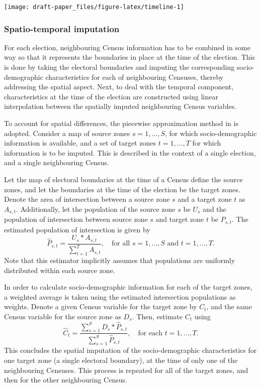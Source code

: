 \documentclass[11pt,a4paper,]{article}
\let\origfigure\figure
\let\endorigfigure\endfigure
\renewenvironment{figure}[1][2] {
    \expandafter\origfigure\expandafter[htbp]
} {
    \endorigfigure
}
\begin{document}
\begin{figure}[h]

{\centering \texttt{[image: draft-paper\_files/figure-latex/timeline-1]} 

}

\caption{Timeline of Australian elections and Censuses. They do not always occur in the same year.}\label{fig:timeline}
\end{figure}

\hypertarget{spatio-temporal-imputation}{%
\subsubsection{Spatio-temporal imputation}\label{spatio-temporal-imputation}}

For each election, neighbouring Census information has to be combined in some way so that it represents the boundaries in place at the time of the election. This is done by taking the electoral boundaries and imputing the corresponding socio-demographic characteristics for each of neighbouring Censuses, thereby addressing the spatial aspect. Next, to deal with the temporal component, characteristics at the time of the election are constructed using linear interpolation between the spatially imputed neighbouring Census variables.

To account for spatial differences, the piecewise approximation method in \textcite{Goodchild1993} is adopted. Consider a map of source zones \(s = 1,\dots,S\), for which socio-demographic information is available, and a set of target zones \(t = 1,\dots,T\) for which information is to be imputed. This is described in the context of a single election, and a single neighbouring Census.

Let the map of electoral boundaries at the time of a Census define the source zones, and let the boundaries at the time of the election be the target zones. Denote the area of intersection between a source zone \(s\) and a target zone \(t\) as \(A_{s,t}\). Additionally, let the population of the source zone \(s\) be \(U_s\) and the population of intersection between source zone \(s\) and target zone \(t\) be \(P_{s,t}\). The estimated population of intersection is given by
\[
  \hat{P}_{s,t} = \frac{U_s*A_{s,t}}{\sum_{t=1}^T A_{s,t}},
  \quad\text{for all $s=1,\dots,S$ and $t=1,\dots,T$}.
\]
Note that this estimator implicitly assumes that populations are uniformly distributed within each source zone.

In order to calculate socio-demographic information for each of the target zones, a weighted average is taken using the estimated intersection populations as weights. Denote a given Census variable for the target zone by \(C_t\), and the same Census variable for the source zone as \(D_s\). Then, estimate \(C_t\) using
\[
  \hat{C}_t = \frac{\sum_{s=1}^{S}{D_s*\hat{P}_{s,t}}}%
  {\sum_{s=1}^{S}{\hat{P}_{s,t}}},
  \quad\text{for each $t=1,\dots,T$}.
\]
This concludes the spatial imputation of the socio-demographic characteristics for one target zone (a single electoral boundary), at the time of only one of the neighbouring Censuses. This process is repeated for all of the target zones, and then for the other neighbouring Census.
\end{document}
